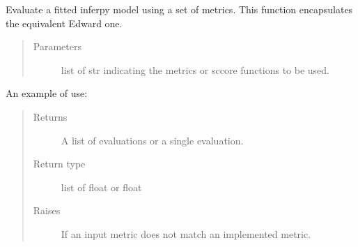 \documentclass[letterpaper,10pt,english]{sphinxmanual}
\begin{document}

\begin{fulllineitems}
\label{\detokenize{modules/inferpy.criticism:inferpy.criticism.evaluate.evaluate}}
Evaluate a fitted inferpy model using a set of metrics. This function
encapsulates the equivalent Edward one.
\begin{quote}\begin{description}
\item[{Parameters}] \leavevmode
{} \textendash{} list of str indicating the metrics or sccore functions to be used.

\end{description}\end{quote}

An example of use:

\begin{sphinxVerbatim}[commandchars=\\\{\}]
       
\end{sphinxVerbatim}
\begin{quote}\begin{description}
\item[{Returns}] \leavevmode
A list of evaluations or a single evaluation.

\item[{Return type}] \leavevmode
list of float or float

\item[{Raises}] \leavevmode
{} \textendash{} If an input metric does not match an implemented metric.

\end{description}\end{quote}

\end{fulllineitems}
\end{document}
